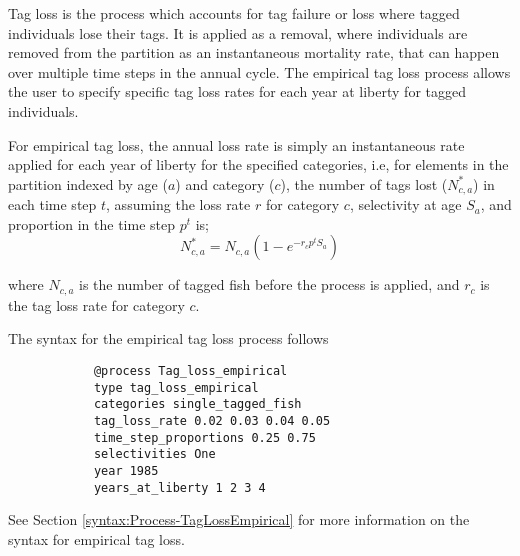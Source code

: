 Tag loss is the process which accounts for tag failure or loss where tagged individuals lose their tags. It is applied as a removal, where individuals are removed from the partition as an instantaneous mortality rate, that can happen over multiple time steps in the annual cycle. The empirical tag loss process allows the user to specify specific tag loss rates for each year at liberty for tagged individuals.

For empirical tag loss, the annual loss rate is simply an instantaneous rate applied for each year of liberty for the specified categories, i.e, for elements in the partition indexed by age ($a$) and category ($c$), the number of tags lost ($N^*_{c,a}$) in each time step $t$, assuming the loss rate $r$ for category $c$, selectivity at age $S_a$, and proportion in the time step $p^t$ is; 
\begin{equation}
	N^*_{c,a} = N_{c,a} (1 -e^{-r_c p^t S_a})
\end{equation}

where $N_{c,a}$ is the number of tagged fish before the process is applied, and $r_c$ is the tag loss rate for category $c$.

The syntax for the empirical tag loss process follows

{\small{\begin{verbatim}
			@process Tag_loss_empirical
			type tag_loss_empirical
			categories single_tagged_fish
			tag_loss_rate 0.02 0.03 0.04 0.05
			time_step_proportions 0.25 0.75
			selectivities One
			year 1985
			years_at_liberty 1 2 3 4
\end{verbatim}}}

See Section \ref{syntax:Process-TagLossEmpirical} for more information on the syntax for empirical tag loss.
